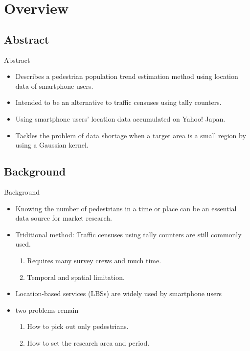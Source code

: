 \section{Overview}\label{overview}

\subsection{Abstract}\label{abstract}

\begin{frame}{Abstract}

\begin{itemize}
\itemsep1pt\parskip0pt
\item
  Describes a pedestrian population trend estimation method using
  location data of smartphone users.
\item
  Intended to be an alternative to traffic censuses using tally
  counters.
\item
  Using smartphone users' location data accumulated on Yahoo! Japan.
\item
  Tackles the problem of data shortage when a target area is a small
  region by using a Gaussian kernel.
\end{itemize}

\end{frame}

\subsection{Background}\label{background}

\begin{frame}{Background}

\begin{itemize}
\itemsep1pt\parskip0pt
\item
  Knowing the number of pedestrians in a time or place can be an
  essential data source for market research.
\item
  Triditional method: Traffic censuses using tally counters are still
  commonly used.

  \begin{enumerate}
  \def\labelenumi{\arabic{enumi})}
  \itemsep1pt\parskip0pt
  \item
    Requires many survey crews and much time.
  \item
    Temporal and spatial limitation.
  \end{enumerate}
\item
  Location-based services (LBSs) are widely used by smartphone users
\item
  two problems remain

  \begin{enumerate}
  \def\labelenumi{\arabic{enumi})}
  \itemsep1pt\parskip0pt
  \item
    How to pick out only pedestrians.
  \item
    How to set the research area and period.
  \end{enumerate}
\end{itemize}

\end{frame}

